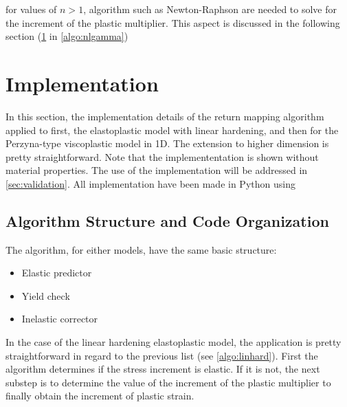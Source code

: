 \documentclass[final,5p,times,twocolumn]{elsarticle}
\begin{document}
for values of $n>1$, algorithm such as Newton-Raphson are needed to solve for the increment of the plastic multiplier. This aspect is discussed in the following section (\cref{sec:implementation} in  \cref{algo:nlgamma})

\section{Implementation}
\label{sec:implementation}
In this section, the implementation details of the return mapping algorithm applied to first, the elastoplastic model with linear hardening, and then for the Perzyna-type viscoplastic model in 1D. The extension to higher dimension is pretty straightforward. Note that the implemententation is shown without material properties. The use of the implementation will be addressed in \cref{sec:validation}. All implementation have been made in Python using \cite{2020SciPy-NMeth,harris2020array}

\subsection{Algorithm Structure and Code Organization}
\label{Algorithm Structure}
The algorithm, for either models, have the same basic structure:
\begin{itemize}
  \item Elastic predictor
  \item Yield check
  \item Inelastic corrector
\end{itemize}

In the case of the linear hardening elastoplastic model, the application is pretty straightforward in regard to the previous list (see \cref{algo:linhard}). First the algorithm determines if the stress increment is elastic. If it is not, the next substep is to determine the value of the increment of the plastic multiplier to finally obtain the increment of plastic strain.
\end{document}
